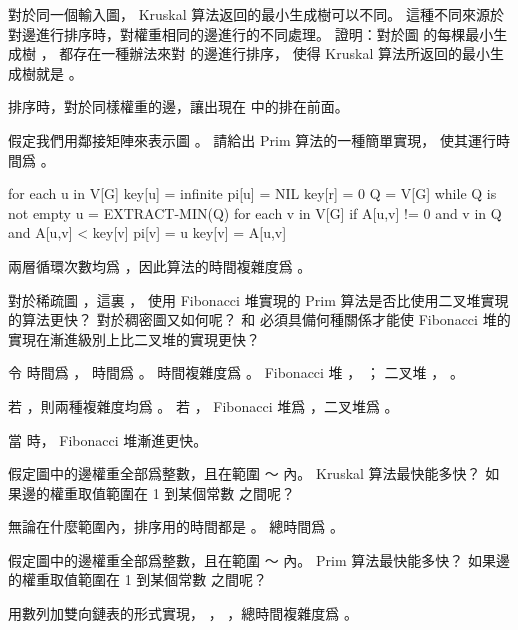 \startsection[
  title={The algorithms of Kruskal and Prim},
]

\startEXERCISE
對於同一個輸入圖， Kruskal 算法返回的最小生成樹可以不同。
這種不同來源於對邊進行排序時，對權重相同的邊進行的不同處理。
證明：對於圖  的每棵最小生成樹 ，
都存在一種辦法來對  的邊進行排序，
使得 Kruskal 算法所返回的最小生成樹就是 。
\stopEXERCISE

\startANSWER
排序時，對於同樣權重的邊，讓出現在  中的排在前面。
\stopANSWER

\startEXERCISE
假定我們用鄰接矩陣來表示圖 。
請給出 Prim 算法的一種簡單實現，
使其運行時間爲 。
\stopEXERCISE

\startANSWER
{}
\startCLRS
for each u in V[G]
	key[u] = infinite
	pi[u] = NIL
key[r] = 0
Q = V[G]
while Q is not empty
	u = EXTRACT-MIN(Q)
	for each v in V[G]
		if A[u,v] != 0 and v in Q and A[u,v] < key[v]
			pi[v] = u
			key[v] = A[u,v]
\stopCLRS

兩層循環次數均爲 ，因此算法的時間複雜度爲 。
\stopANSWER

\startEXERCISE
對於稀疏圖 ，這裏 ，
使用 Fibonacci 堆實現的 Prim 算法是否比使用二叉堆實現的算法更快？
對於稠密圖又如何呢？
  和  必須具備何種關係才能使 Fibonacci 堆的實現在漸進級別上比二叉堆的實現更快？
\stopEXERCISE

\startANSWER
令  時間爲 ，  時間爲 。
時間複雜度爲 。
 Fibonacci 堆 ， ；
二叉堆 ， 。

若 ，則兩種複雜度均爲 。
若 ， Fibonacci 堆爲 ，二叉堆爲 。

當  時， Fibonacci 堆漸進更快。
\stopANSWER

\startEXERCISE
假定圖中的邊權重全部爲整數，且在範圍 ～ 內。
 Kruskal 算法最快能多快？
如果邊的權重取值範圍在 1 到某個常數  之間呢？
\stopEXERCISE

\startANSWER
無論在什麼範圍內，排序用的時間都是 。
總時間爲 。
\stopANSWER

\startEXERCISE
假定圖中的邊權重全部爲整數，且在範圍 ～ 內。
 Prim 算法最快能多快？
如果邊的權重取值範圍在 1 到某個常數  之間呢？
\stopEXERCISE

\startANSWER
用數列加雙向鏈表的形式實現， ， ，總時間複雜度爲 。
\stopANSWER

